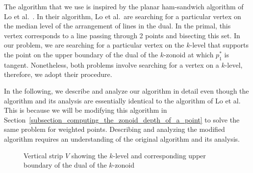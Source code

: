 \documentclass[charterfonts,lotsofwhite]{patmorin}
\begin{document}
The algorithm that we use is inspired by the planar ham-sandwich
algorithm of Lo et al.\ \cite{algorithms_for_ham_sandwich_cuts}. In
their algorithm, Lo et al.\ are searching for a particular vertex on
the median level of the arrangement of lines in the dual. In the
primal, this vertex corresponds to a line passing through 2 points and
bisecting this set. In our problem, we are searching for a particular
vertex on the $k$-level that supports the point on the upper boundary
of the dual of the $k$-zonoid at which $p_1^*$ is tangent.
Nonetheless, both problems involve searching for a vertex on a
$k$-level, therefore, we adopt their procedure.

In the following, we describe and analyze our algorithm in detail even
though the algorithm and its analysis are essentially identical to the
algorithm of Lo et al.  This is because we will be modifying this
algorithm in
Section~\ref{subsection_computing_the_zonoid_depth_of_a_point} to
solve the same problem for weighted points.  Describing and analyzing
the modified algorithm requires an understanding of the original
algorithm and its analysis.

\begin{figure}[h!]
 \begin{center} 
   \caption{\label{fig_vertical_strip}Vertical strip $V$ showing the $k$-level and corresponding upper boundary of the dual of the $k$-zonoid}
 \end{center}
\end{figure}
\end{document}
